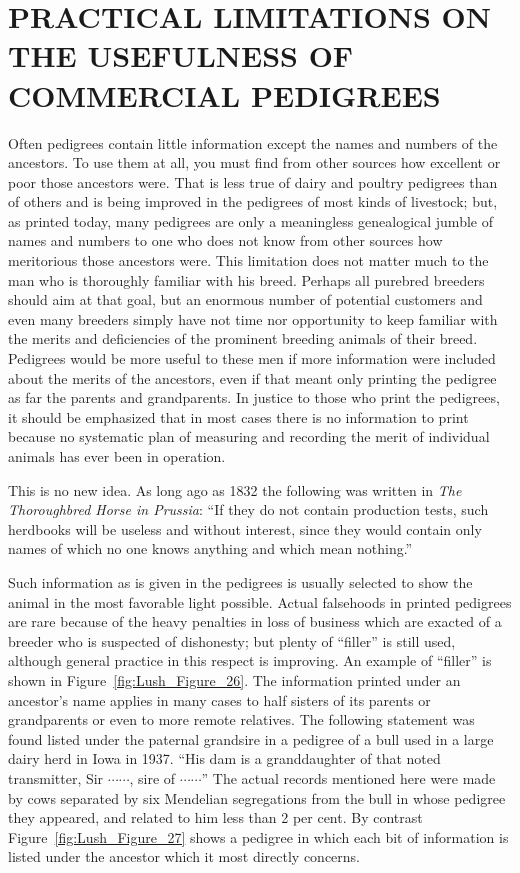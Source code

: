 \section*{PRACTICAL LIMITATIONS ON THE USEFULNESS OF COMMERCIAL PEDIGREES}

Often pedigrees contain little information except the names and
numbers of the ancestors. To use them at all, you must find from other
sources how excellent or poor those ancestors were. That is less true of
dairy and poultry pedigrees than of others and is being improved in the
pedigrees of most kinds of livestock; but, as printed today, many pedigrees
are only a meaningless genealogical jumble of names and numbers
to one who does not know from other sources how meritorious
those ancestors were. This limitation does not matter much to the man
who is thoroughly familiar with his breed. Perhaps all purebred breeders
should aim at that goal, but an enormous number of potential customers
and even many breeders simply have not time nor opportunity
to keep familiar with the merits and deficiencies of the prominent
breeding animals of their breed. Pedigrees would be more useful to
these men if more information were included about the merits of the
ancestors, even if that meant only printing the pedigree as far the
parents and grandparents. In justice to those who print the pedigrees,
it should be emphasized that in most cases there is no information to
print because no systematic plan of measuring and recording the merit
of individual animals has ever been in operation.

This is no new idea. As long ago as 1832 the following was written
in \textit{The Thoroughbred Horse in Prussia}: ``If they do not contain production
tests, such herdbooks will be useless and without interest, since
they would contain only names of which no one knows anything and
which mean nothing.''

Such information as is given in the pedigrees is usually selected to
show the animal in the most favorable light possible. Actual falsehoods
in printed pedigrees are rare because of the heavy penalties in loss of
business which are exacted of a breeder who is suspected of dishonesty;
but plenty of ``filler'' is still used,
although general practice in this
respect is improving. An example of ``filler'' is shown in Figure~\ref{fig:Lush_Figure_26}. The
information printed under an ancestor's name applies in many cases to
half sisters of its parents or grandparents or even to more remote relatives.
The following statement was found listed under the paternal
grandsire in a pedigree of a bull used in a large dairy herd in Iowa in
1937. ``His dam is a granddaughter of that noted transmitter, Sir
$\cdots\cdots$, sire of $\cdots\cdots$'' The actual records
mentioned here were made by cows separated by six Mendelian segregations
from the bull in whose pedigree they appeared, and related to
him less than 2 per cent. By contrast Figure~\ref{fig:Lush_Figure_27} shows a pedigree in
which each bit of information is listed under the ancestor which it most
directly concerns.
\nowidow


